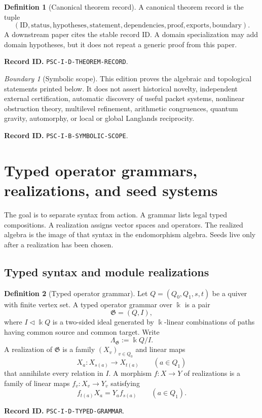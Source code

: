\documentclass[11pt]{article}
\theoremstyle{definition}
\newtheorem{definition}[definition]{Definition}
\theoremstyle{remark}
\newtheorem{boundary}[boundary]{Boundary}
\newcommand{\bbk}{\Bbbk}
\newcommand{\RecordID}[1]{\par\smallskip\noindent\begingroup\footnotesize\color{PSCGray}\raggedright\textbf{Record ID.} \nolinkurl{#1}.\par\endgroup}
\begin{document}
\begin{definition}[Canonical theorem record]
\label{def:theorem-record}
A canonical theorem record is the tuple
\[
(\mathrm{ID},\mathrm{status},\mathrm{hypotheses},\mathrm{statement},
\mathrm{dependencies},\mathrm{proof},\mathrm{exports},\mathrm{boundary}).
\]
A downstream paper cites the stable record ID.  A domain specialization may add domain hypotheses, but it does not repeat a generic proof from this paper.
\end{definition}
\RecordID{PSC-I-D-THEOREM-RECORD}

\begin{boundary}[Symbolic scope]
\label{bnd:symbolic-scope}
This edition proves the algebraic and topological statements printed below.  It does not assert historical novelty, independent external certification, automatic discovery of useful packet systems, nonlinear obstruction theory, multilevel refinement, arithmetic congruences, quantum gravity, automorphy, or local or global Langlands reciprocity.
\end{boundary}
\RecordID{PSC-I-B-SYMBOLIC-SCOPE}

\section{Typed operator grammars, realizations, and seed systems}
\begin{readerroadmap}
The goal is to separate syntax from action.  A grammar lists legal typed compositions.  A realization assigns vector spaces and operators.  The realized algebra is the image of that syntax in the endomorphism algebra.  Seeds live only after a realization has been chosen.
\end{readerroadmap}
\subsection{Typed syntax and module realizations}

\begin{definition}[Typed operator grammar]
\label{def:typed-grammar}
Let $Q=(Q_0,Q_1,s,t)$ be a quiver with finite vertex set.  A typed operator grammar over $\bbk$ is a pair
\[
\mathfrak G=(Q,I),
\]
where $I\triangleleft \bbk Q$ is a two-sided ideal generated by $\bbk$-linear combinations of paths having common source and common target.  Write
\[
\Lambda_{\mathfrak G}:=\bbk Q/I.
\]
A realization of $\mathfrak G$ is a family $(X_v)_{v\in Q_0}$ and linear maps
\[
X_a:X_{s(a)}\longrightarrow X_{t(a)}
\qquad(a\in Q_1)
\]
that annihilate every relation in $I$.  A morphism $f:X\to Y$ of realizations is a family of linear maps $f_v:X_v\to Y_v$ satisfying
\[
f_{t(a)}X_a=Y_af_{s(a)}
\qquad(a\in Q_1).
\]
\end{definition}
\RecordID{PSC-I-D-TYPED-GRAMMAR}
\end{document}
